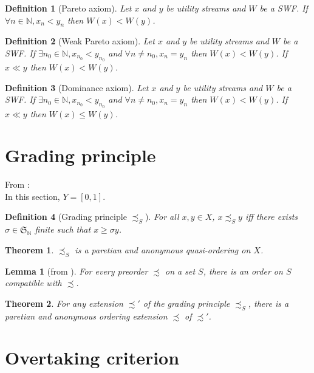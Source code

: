 \documentclass{article}
\newtheorem{definition}{Definition}
\newtheorem{theorem}{Theorem}
\newtheorem{lemma}{Lemma}
\begin{document}
\begin{definition}[Pareto axiom]
  Let $x$ and $y$ be utility streams and $W$ be a SWF.
  If $\forall n \in\mathbb N,x_n<y_n$ then $W(x)<W(y)$.
\end{definition}

\begin{definition}[Weak Pareto axiom]
  Let $x$ and $y$ be utility streams and $W$ be a SWF.
  If $\exists n_0\in\mathbb N, x_{n_0}<y_{n_0}$ and $\forall n\neq n_0, x_n=y_n$ then $W(x)<W(y)$.
  If $x\ll y$ then $W(x)< W(y)$.
\end{definition}

\begin{definition}[Dominance axiom]
  Let $x$ and $y$ be utility streams and $W$ be a SWF.
  If $\exists n_0\in\mathbb N, x_{n_0}<y_{n_0}$ and $\forall n\neq n_0, x_n=y_n$ then $W(x)<W(y)$.
  If $x\ll y$ then $W(x)\leq W(y)$.
\end{definition}

\section{Grading principle}

From \cite{svensson80}:\bigskip\\
In this section, $Y=[0,1]$.
\begin{definition}[Grading principle $\precsim_S$]
    For all $x,y\in X$, $x \precsim_S y$ iff there exists
    $\sigma\in\mathfrak{S}_{\mathbb{N}}$ finite
    such that $x\geq\sigma y$.
\end{definition}

\begin{theorem}
    $\precsim_S$ is a paretian and anonymous quasi-ordering on $X$.
\end{theorem}

\begin{lemma}[from \cite{szpilrajn30}]
    For every preorder $\precsim$ on a set $S$, there is an order on
    $S$ compatible with $\precsim$.
\end{lemma}

\begin{theorem}
    For any extension $\precsim'$ of the grading principle 
    $\precsim_S$, there is a paretian
    and anonymous ordering extension $\precsim$ of $\precsim'$.
\end{theorem}


\section{Overtaking criterion}
\end{document}
